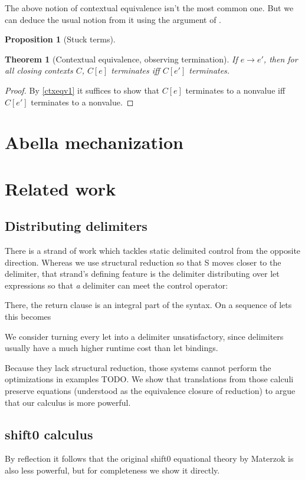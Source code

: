 \documentclass[a4paper, 11pt,titlepage, openright, twoside]{report}
\newcommand{\+}{\enspace}
\newtheorem{theorem}{Theorem}
\newtheorem{prop}{Proposition}
\begin{document}
The above notion of contextual equivalence isn't the most common one.
But we can deduce the usual notion from it using the argument of \cite{bisim}.

\begin{prop}[Stuck terms]
\end{prop}

\begin{theorem}[Contextual equivalence, observing termination]
	If $e → e'$, then for all closing contexts $C$, $C[e]$ terminates iff $C[e']$ terminates.
\end{theorem}
\begin{proof}
	By \ref{ctxeqv1} it suffices to show that
	$C[e]$ terminates to a nonvalue iff $C[e']$ terminates to a nonvalue.
\end{proof}

\chapter{Abella mechanization}

\chapter{Related work}


\section{Distributing delimiters}
There is a strand of work which tackles static delimited control from the opposite direction.
Whereas we use structural reduction so that S moves closer to the delimiter, that strand's defining feature is
the delimiter distributing over let expressions so that \textit{a} delimiter can meet the control operator:

There, the return clause is an integral part of the syntax. On a sequence of lets this becomes

We consider turning every let into a delimiter unsatisfactory, since delimiters usually have a much higher runtime cost than let bindings.

Because they lack structural reduction, those systems cannot perform the optimizations in examples TODO.
We show that translations from those calculi preserve equations (understood as the equivalence closure of reduction)
to argue that our calculus is more powerful.

\section{shift0 calculus}
By reflection\cite{ppdp21} it follows that the original shift0 equational theory by Materzok is also less powerful,
but for completeness we show it directly.
\end{document}
